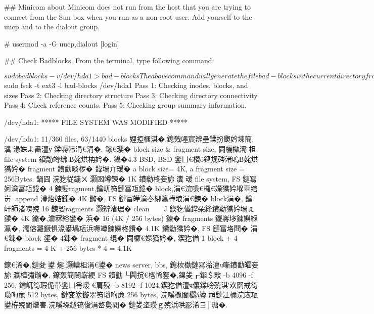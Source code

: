 {## Minicom about
Minicom does not run from the host that you are trying to connect from the Sun box when you run as a non-root user.
Add yourself to the uucp and to the dialout group.

# usermod -a -G uucp,dialout [login]


## Check Badblocks.
From the terminal, type following command:

    $ sudo badblocks -v /dev/hda1 > bad-blocks

    The above command will generate the file bad-blocks in the current directory from where you are running this command.

    Now, you can pass this file to the fsck command to record these bad blocks

        $ sudo fsck -t ext3 -l bad-blocks /dev/hda1
            Pass 1: Checking inodes, blocks, and sizes
                Pass 2: Checking directory structure
                    Pass 3: Checking directory connectivity
                        Pass 4: Check reference counts.
                            Pass 5: Checking group summary information.

                                /dev/hda1: ***** FILE SYSTEM WAS MODIFIED *****

                                    /dev/hda1: 11/360 files, 63/1440 blocks
娌掗棞淇�,鎴戣嚜宸辨壘鍒扮瓟妗堜簡,瀵湪姝よ畵澶у鍒嗕韩涓€涓�.
        鎵€璎� block size & fragment size, 閫欐槸灞柤 file system
        鐨勪竴绋В姹烘柟妗�. 鑷�4.3 BSD, BSD 鐢ㄩ€欑ó鏂规硶渚嗚В姹烘獢妗� fragment
        鐨勫晱椤�
                鍏堝亣瑷�  a block size= 4K, a fragment size = 256Bytes.
        鍋囧浣犵従鍦ㄨ灏囦竴鍊� 1K 鐨勬柊妾旀瀵叆 file system, FS 鏈冩妸瀹冨瓨鍏� 4
        鍊媐ragment,鑰屼笉鏈冨瓨鍏� block,涓€浣嗛€欏€嬫獢妗堢辜绾岃 append 澧炲姞鍒� 4K
        鏅�, FS 鏈冨皣瀹冭綁瀛樺埌涓€鍊� block涓�, 鑰屽師渚嗙殑 16 鍊媐ragments 灏辨渻琚� clean
                                           ^^^^^^^^^^^^^^^^^^^^
                                       鍥犵偤鐣朵綘鐨勬獢妗堝ぇ鍒� 4K 鏅�,瀹冧綌鐢�
                                       浜� 16 (4K / 256 bytes) 鍊� fragments
                鍐嶈垑鍊嬩緥瀛�, 濡傛灉鐝惧湪鍙堝瓨浜嗕竴鍊嬫柊鐨� 4.1K 鐨勬獢妗�, FS 鏈冨垎閰�
        涓€鍊� block 鍙� 4鍊� fragment 绲� 閫欏€嬫獢妗�,
        鍥犵偤 1 block + 4 fragments = 4 K + 256 bytes * 4 = 4.1K

        鎵€浠�,鏈夋鍙煡,灏嶆柤涓€鍙� news server, bbs, 鎴栨槸鏈冩湁澶ч噺鐨勫皬妾旀瀛樺彇鏅�,
        鐐轰簡闄嶄綆 FS 鐨勭┖闁撹€楁悕鐜�,鎳夎┎鎺＄敤 -b 4096 -f 256,
        鑰屼笉瑕佹帯鐢ㄩ爯瑷€肩殑 -b 8192 -f 1024,鍥犵偤澶ч儴鍒嗙殑淇′欢閮戒笉瓒呴亷 512 bytes,
        鏈変簺鏇翠笉瓒呴亷 256 bytes, 浣嗘槸閫欐ǎ鍙兘鏈冮檷浣庡瓨鍙栫殑閫熷害.浣嗘垜鐩镐俊涓嶅毚閲�
        鏈夎垐瓒ｇ殑浜哄彲浠ヨ│瑭�.

}
